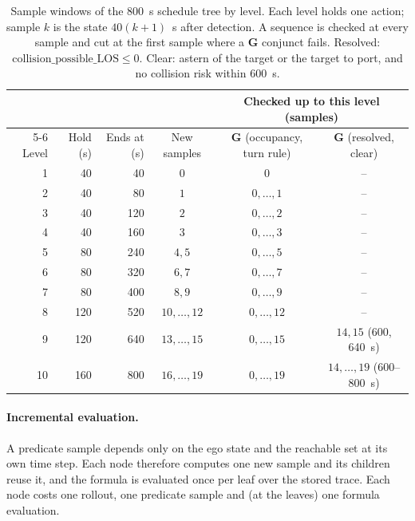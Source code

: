 \documentclass[11pt,a4paper]{article}
\begin{document}
\begin{table}[htbp]
\centering
\caption{Sample windows of the 800~s schedule tree by level. Each level holds
one action; sample $k$ is the state $40(k+1)$~s after detection. A sequence is
checked at every sample and cut at the first sample where a $\mathbf{G}$
conjunct fails. Resolved: $\mathrm{collision\_possible\_LOS} \le 0$. Clear:
astern of the target or the target to port, and no collision risk within
600~s.}
\label{tab:windows}
\small
\begin{tabular}{@{}rrrccc@{}}
\toprule
 & & & & \multicolumn{2}{c}{Checked up to this level (samples)} \\
\cmidrule(l){5-6}
Level & Hold (s) & Ends at (s) & New samples & $\mathbf{G}$ (occupancy, turn rule) & $\mathbf{G}$ (resolved, clear) \\
\midrule
1  & 40  & 40  & $0$              & $0$              & -- \\
2  & 40  & 80  & $1$              & $0,\dots,1$      & -- \\
3  & 40  & 120 & $2$              & $0,\dots,2$      & -- \\
4  & 40  & 160 & $3$              & $0,\dots,3$      & -- \\
5  & 80  & 240 & $4,5$            & $0,\dots,5$      & -- \\
6  & 80  & 320 & $6,7$            & $0,\dots,7$      & -- \\
7  & 80  & 400 & $8,9$            & $0,\dots,9$      & -- \\
8  & 120 & 520 & $10,\dots,12$    & $0,\dots,12$     & -- \\
9  & 120 & 640 & $13,\dots,15$    & $0,\dots,15$     & $14,15$ (600, 640~s) \\
10 & 160 & 800 & $16,\dots,19$    & $0,\dots,19$     & $14,\dots,19$ (600--800~s) \\
\bottomrule
\end{tabular}
\end{table}

\paragraph{Incremental evaluation.} A predicate sample depends only on the ego
state and the reachable set at its own time step. Each node therefore computes
one new sample and its children reuse it, and the formula is evaluated once
per leaf over the stored trace. Each node costs one rollout, one predicate
sample and (at the leaves) one formula evaluation.
\end{document}
